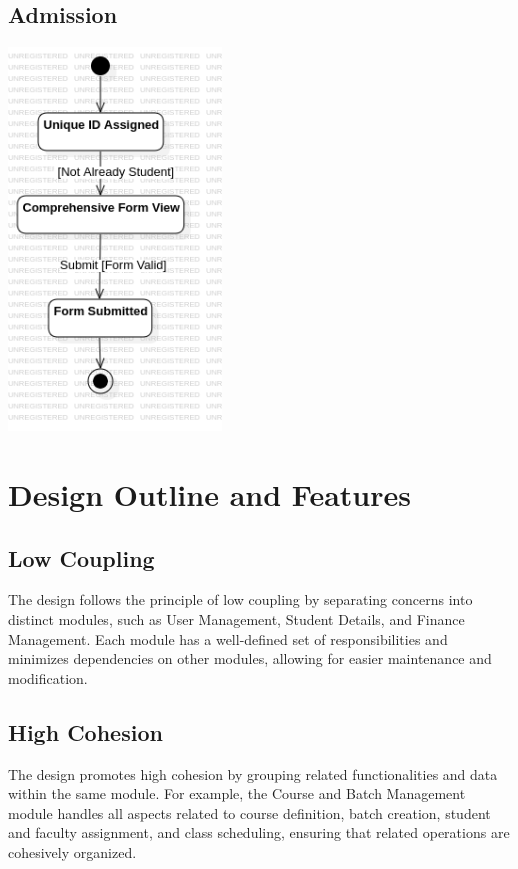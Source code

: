 \documentclass[11pt]{article}
\begin{document}
\subsection{Admission}
\begin{center}
\includegraphics[height=4in]{state_diagrams/StateMachine6!Admission_5.png}
\end{center}



\section{Design Outline and Features}

\subsection{Low Coupling}
The design follows the principle of low coupling by separating concerns into distinct modules, such as User Management, Student Details, and Finance Management. Each module has a well-defined set of responsibilities and minimizes dependencies on other modules, allowing for easier maintenance and modification.

\subsection{High Cohesion}
The design promotes high cohesion by grouping related functionalities and data within the same module. For example, the Course and Batch Management module handles all aspects related to course definition, batch creation, student and faculty assignment, and class scheduling, ensuring that related operations are cohesively organized.
\end{document}
